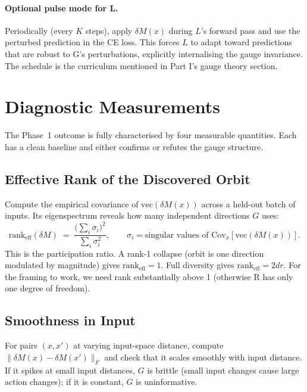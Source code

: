 \documentclass[11pt, a4paper]{article}
\theoremstyle{plain}
\theoremstyle{definition}
\theoremstyle{remark}
\begin{document}
\paragraph{Optional pulse mode for L.}
Periodically (every $K$ steps), apply $\delta M(x)$ during $L$'s forward pass and use the perturbed prediction in the CE loss.
This forces $L$ to adapt toward predictions that are robust to G's perturbations, explicitly internalising the gauge invariance.
The schedule is the curriculum mentioned in Part I's gauge theory section.


\section{Diagnostic Measurements}
\label{sec:diagnostics-part2}

The Phase~1 outcome is fully characterised by four measurable quantities.
Each has a clean baseline and either confirms or refutes the gauge structure.

\subsection{Effective Rank of the Discovered Orbit}

Compute the empirical covariance of $\mathrm{vec}(\delta M(x))$ across a held-out batch of inputs.
Its eigenspectrum reveals how many independent directions $G$ uses:
\begin{equation}
\mathrm{rank}_{\text{eff}}(\delta M) \;=\; \frac{\big(\sum_{i} \sigma_{i}\big)^{2}}{\sum_{i} \sigma_{i}^{2}}, \qquad \sigma_{i} = \text{singular values of } \mathrm{Cov}_{x}[\mathrm{vec}(\delta M(x))].
\end{equation}
This is the participation ratio.
A rank-1 collapse (orbit is one direction modulated by magnitude) gives $\mathrm{rank}_{\text{eff}} = 1$.
Full diversity gives $\mathrm{rank}_{\text{eff}} = 2dr$.
For the framing to work, we need rank substantially above 1 (otherwise R has only one degree of freedom).

\subsection{Smoothness in Input}

For pairs $(x, x')$ at varying input-space distance, compute $\|\delta M(x) - \delta M(x')\|_{F}$ and check that it scales smoothly with input distance.
If it spikes at small input distances, $G$ is brittle (small input changes cause large action changes); if it is constant, $G$ is uninformative.
\end{document}
